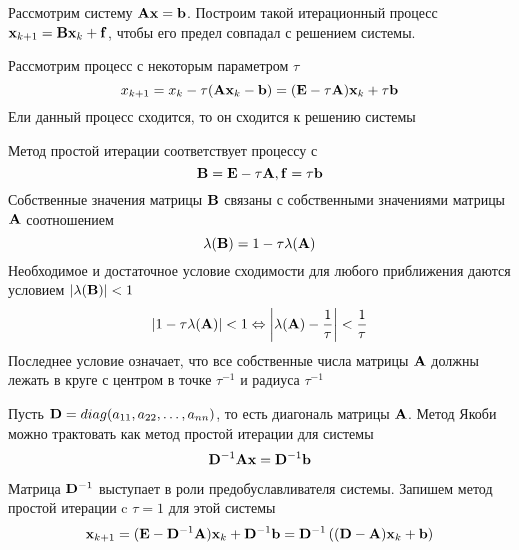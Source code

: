 \documentclass[professionalfonts,compress,unicode]{beamer}
\begin{document}
{
	Рассмотрим систему ${\bf A}{\bf x} = {\bf b}$. Построим такой итерационный процесс ${\bf x}_{k+1} = {\bf B} {\bf x}_k + {\bf f}$, чтобы 
	его предел совпадал с решением системы.
	
	\pause
	Рассмотрим процесс с некоторым параметром $\tau$
	$$
	x_{k+1} = x_k - \tau({\bf A}{\bf x}_k - {\bf b}) = ({\bf E} - \tau {\bf A}) {\bf x}_k + \tau {\bf b}
	$$
	Ели данный процесс сходится, то он сходится к решению системы
}

{
	Метод простой итерации соответствует процессу с $${\bf B} = {\bf E} - \tau {\bf A}, {\bf f} = \tau {\bf b}$$
	\pause
	Собственные значения матрицы ${\bf B}$ связаны с собственными значениями матрицы ${\bf A}$ соотношением
	$$
	\lambda({\bf B}) = 1 - \tau \lambda({\bf A})
	$$
	Необходимое и достаточное условие сходимости для любого приближения даются условием $|\lambda({\bf B})| < 1$
	$$
	|1 - \tau \lambda({\bf A})| < 1 \Leftrightarrow \left|\lambda({\bf A}) - \frac{1}{\tau}\right| < \frac{1}{\tau}
	$$
	Последнее условие означает, что все собственные числа матрицы ${\bf A}$ должны лежать в круге с центром в точке $\tau^{-1}$ и радиуса $\tau^{-1}$
}

%	
%	
%
{
	Пусть ${\bf D} = \mathop{diag}(a_{11}, a_{22}, \dots, a_{nn})$, то есть диагональ матрицы ${\bf A}$. 
	Метод Якоби можно трактовать как метод простой итерации для системы
	$$
	{\bf D}^{-1} {\bf A} {\bf x} = {\bf D}^{-1} {\bf b}
	$$
	
	Матрица ${\bf D}^{-1}$ выступает в роли предобуславливателя системы. 
	Запишем метод простой итерации c $\tau = 1$ для этой системы 
	$$
	{\bf x}_{k+1} = ({\bf E} - {\bf D}^{-1} {\bf A}) {\bf x}_k + {\bf D}^{-1} {\bf b} = {\bf D}^{-1} \left(({\bf D} - {\bf A}) {\bf x}_k + {\bf b}\right)
	$$
}
\end{document}

